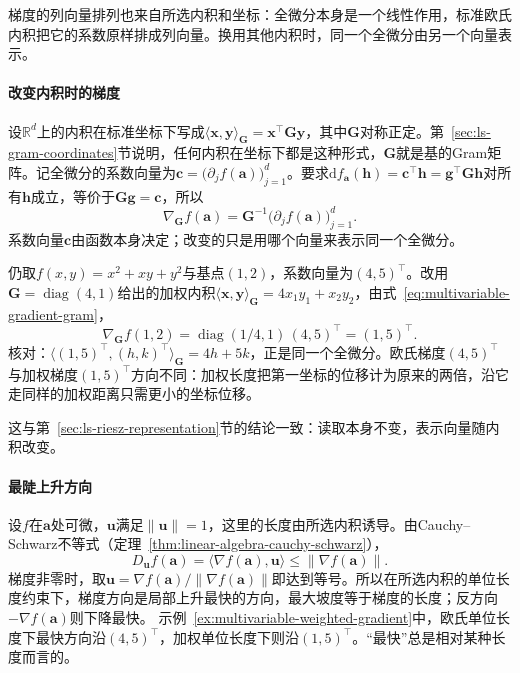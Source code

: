 梯度的列向量排列也来自所选内积和坐标：全微分本身是一个线性作用，标准欧氏内积把它的系数原样排成列向量。换用其他内积时，同一个全微分由另一个向量表示。

\paragraph{改变内积时的梯度}
设$\mathbb R^d$上的内积在标准坐标下写成$\langle\bm x,\bm y\rangle_{\bm G}=\bm x^\top\bm G\bm y$，其中$\bm G$对称正定。第~\ref{sec:ls-gram-coordinates}节说明，任何内积在坐标下都是这种形式，$\bm G$就是基的Gram矩阵。记全微分的系数向量为$\bm c=\bigl(\partial_jf(\bm a)\bigr)_{j=1}^d$。要求$\mathrm df_{\bm a}(\bm h)=\bm c^\top\bm h=\bm g^\top\bm G\bm h$对所有$\bm h$成立，等价于$\bm G\bm g=\bm c$，所以
\begin{equation}
 \nabla_{\bm G}f(\bm a)=\bm G^{-1}\bigl(\partial_jf(\bm a)\bigr)_{j=1}^d .
\label{eq:multivariable-gradient-gram}
\end{equation}
系数向量$\bm c$由函数本身决定；改变的只是用哪个向量来表示同一个全微分。
\begin{example}[加权内积下的梯度]
\label{ex:multivariable-weighted-gradient}
仍取$f(x,y)=x^2+xy+y^2$与基点$(1,2)$，系数向量为$(4,5)^\top$。改用$\bm G=\operatorname{diag}(4,1)$给出的加权内积$\langle\bm x,\bm y\rangle_{\bm G}=4x_1y_1+x_2y_2$，由式~\eqref{eq:multivariable-gradient-gram}，
\[
 \nabla_{\bm G}f(1,2)=\operatorname{diag}(1/4,1)\,(4,5)^\top=(1,5)^\top.
\]
核对：$\langle(1,5)^\top,(h,k)^\top\rangle_{\bm G}=4h+5k$，正是同一个全微分。欧氏梯度$(4,5)^\top$与加权梯度$(1,5)^\top$方向不同：加权长度把第一坐标的位移计为原来的两倍，沿它走同样的加权距离只需更小的坐标位移。
\end{example}
这与第~\ref{sec:ls-riesz-representation}节的结论一致：读取本身不变，表示向量随内积改变。

\paragraph{最陡上升方向}
设$f$在$\bm a$处可微，$\bm u$满足$\lVert\bm u\rVert=1$，这里的长度由所选内积诱导。由Cauchy--Schwarz不等式（定理~\ref{thm:linear-algebra-cauchy-schwarz}），
\[
 D_{\bm u}f(\bm a)=\langle\nabla f(\bm a),\bm u\rangle\leq\lVert\nabla f(\bm a)\rVert.
\]
梯度非零时，取$\bm u=\nabla f(\bm a)/\lVert\nabla f(\bm a)\rVert$即达到等号。所以在所选内积的单位长度约束下，梯度方向是局部上升最快的方向，最大坡度等于梯度的长度；反方向$-\nabla f(\bm a)$则下降最快。
示例~\ref{ex:multivariable-weighted-gradient}中，欧氏单位长度下最快方向沿$(4,5)^\top$，加权单位长度下则沿$(1,5)^\top$。“最快”总是相对某种长度而言的。

